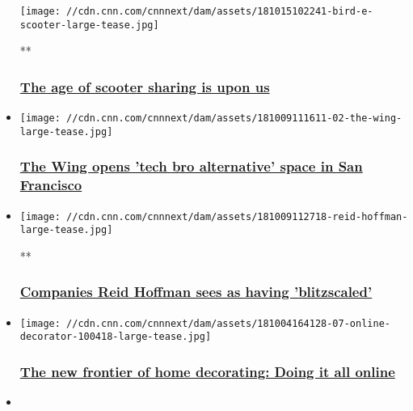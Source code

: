 \begin{itemize}
  \texttt{[image: //cdn.cnn.com/cnnnext/dam/assets/181015102241-bird-e-scooter-large-tease.jpg]}

  **

  \hypertarget{the-age-of-scooter-sharing-is-upon-us}{%
  \subsubsection{\texorpdfstring{\href{/videos/business/2018/10/15/electric-scooters-regulation-cities-sharing-orig.cnn-business}{The
  age of scooter sharing is upon
  us}}{The age of scooter sharing is upon us}}\label{the-age-of-scooter-sharing-is-upon-us}}
\item
  \href{/2018/10/09/tech/the-wing-san-francisco/index.html}{}

  \texttt{[image: //cdn.cnn.com/cnnnext/dam/assets/181009111611-02-the-wing-large-tease.jpg]}

  \hypertarget{the-wing-opens-tech-bro-alternative-space-in-san-francisco}{%
  \subsubsection{\texorpdfstring{\href{/2018/10/09/tech/the-wing-san-francisco/index.html}{The
  Wing opens 'tech bro alternative' space in San
  Francisco}}{The Wing opens 'tech bro alternative' space in San Francisco}}\label{the-wing-opens-tech-bro-alternative-space-in-san-francisco}}
\item
  \href{/videos/business/2018/10/09/reid-hoffman-linkedin-venture-capital.cnn-business}{}

  \texttt{[image: //cdn.cnn.com/cnnnext/dam/assets/181009112718-reid-hoffman-large-tease.jpg]}

  **

  \hypertarget{companies-reid-hoffman-sees-as-having-blitzscaled}{%
  \subsubsection{\texorpdfstring{\href{/videos/business/2018/10/09/reid-hoffman-linkedin-venture-capital.cnn-business}{Companies
  Reid Hoffman sees as having
  'blitzscaled'}}{Companies Reid Hoffman sees as having 'blitzscaled'}}\label{companies-reid-hoffman-sees-as-having-blitzscaled}}
\item
  \href{/2018/10/05/tech/havenly/index.html}{}

  \texttt{[image: //cdn.cnn.com/cnnnext/dam/assets/181004164128-07-online-decorator-100418-large-tease.jpg]}

  \hypertarget{the-new-frontier-of-home-decorating-doing-it-all-online}{%
  \subsubsection{\texorpdfstring{\href{/2018/10/05/tech/havenly/index.html}{The
  new frontier of home decorating: Doing it all
  online}}{The new frontier of home decorating: Doing it all online}}\label{the-new-frontier-of-home-decorating-doing-it-all-online}}
\item
\end{itemize}

